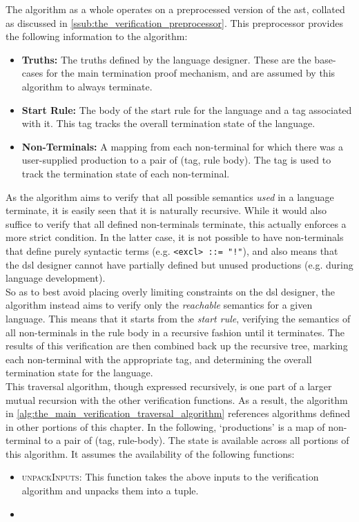 The algorithm as a whole operates on a preprocessed version of the \gls{ast}, collated as discussed in \autoref{ssub:the_verification_preprocessor}. 
This preprocessor provides the following information to the algorithm:
\begin{itemize}
    \item \textbf{Truths:} The truths defined by the language designer.
    These are the base-cases for the main termination proof mechanism, and are assumed by this algorithm to always terminate.
    \item \textbf{Start Rule:} The body of the start rule for the language and a tag associated with it.
    This tag tracks the overall termination state of the language.
    \item \textbf{Non-Terminals:} A mapping from each non-terminal for which there was a user-supplied production to a pair of (tag, rule body).
    The tag is used to track the termination state of each non-terminal. 
\end{itemize}

As the algorithm aims to verify that all possible semantics \textit{used} in a language terminate, it is easily seen that it is naturally recursive. 
While it would also suffice to verify that all defined non-terminals terminate, this actually enforces a more strict condition. 
In the latter case, it is not possible to have non-terminals that define purely syntactic terms (e.g. \texttt{<excl> ::= "!"}), and also means that the \gls{dsl} designer cannot have partially defined but unused productions (e.g. during language development).\\

So as to best avoid placing overly limiting constraints on the \gls{dsl} designer, the algorithm instead aims to verify only the \textit{reachable} semantics for a given language. 
This means that it starts from the \textit{start rule}, verifying the semantics of all non-terminals in the rule body in a recursive fashion until it terminates. 
The results of this verification are then combined back up the recursive tree, marking each non-terminal with the appropriate tag, and determining the overall termination state for the language. \\

This traversal algorithm, though expressed recursively, is one part of a larger mutual recursion with the other verification functions. 
As a result, the algorithm in \autoref{alg:the_main_verification_traversal_algorithm} references algorithms defined in other portions of this chapter.
In the following, `productions' is a map of non-terminal to a pair of (tag, rule-body). 
The state is available across all portions of this algorithm.
It assumes the availability of the following functions:
\begin{itemize}
    \item \textsc{unpackInputs}: This function takes the above inputs to the verification algorithm and unpacks them into a tuple.
    \item 
\end{itemize}

